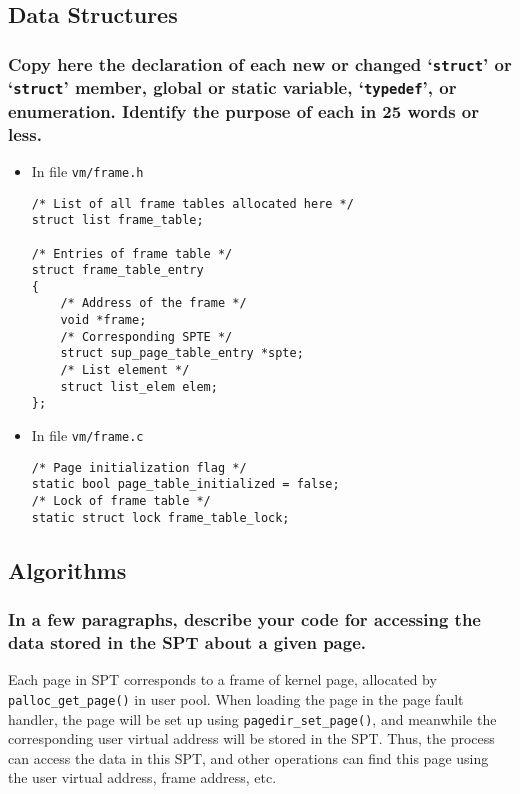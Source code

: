 \documentclass[sigconf, nonacm, balance=false, urlbreakonhyphens=true]{acmart}
\begin{document}
        \label{Page Table Management}
    
        \subsection{Data Structures}
        
            \subsubsection{Copy here the declaration of each new or changed `\texttt{struct}' or `\texttt{struct}' member, global or static variable, `\texttt{typedef}', or enumeration. Identify the purpose of each in 25 words or less. }
        
            \begin{itemize}
                \item In file \texttt{vm/frame.h}
\begin{verbatim}
/* List of all frame tables allocated here */
struct list frame_table;

/* Entries of frame table */
struct frame_table_entry
{
    /* Address of the frame */
    void *frame;
    /* Corresponding SPTE */
    struct sup_page_table_entry *spte;
    /* List element */
    struct list_elem elem;
};
\end{verbatim}
                \item In file \texttt{vm/frame.c}
\begin{verbatim}
/* Page initialization flag */
static bool page_table_initialized = false;
/* Lock of frame table */
static struct lock frame_table_lock;
\end{verbatim}
            \end{itemize}
        \subsection{Algorithms}
        
            \subsubsection{In a few paragraphs, describe your code for accessing the data stored in the SPT about a given page. }

                Each page in SPT corresponds to a frame of kernel page, allocated by \texttt{palloc\_get\_page()} in user pool. When loading the page in the page fault handler, the page will be set up using \texttt{pagedir\_set\_page()}, and meanwhile the corresponding user virtual address will be stored in the SPT. Thus, the process can access the data in this SPT, and other operations can find this page using the user virtual address, frame address, etc. 
\end{document}
